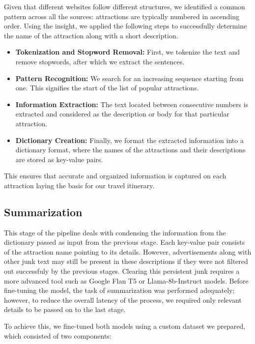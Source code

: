 \documentclass[sigconf,authordraft]{acmart}
\begin{document}
    Given that different websites follow different structures, we identified a common pattern across all the sources: attractions are typically numbered in ascending order. Using the insight, we applied the following steps to successfully determine the name of the attraction along with a short description.

    \begin{itemize}
        \item \textbf{Tokenization and Stopword Removal:} First, we tokenize the text and remove stopwords, after which we extract the sentences.

        \item \textbf{Pattern Recognition:} We search for an increasing sequence starting from one. This signifies the start of the list of popular attractions.

        \item \textbf{Information Extraction:} The text located between consecutive numbers is extracted and considered as the description or body for that particular attraction.

        \item \textbf{Dictionary Creation:} Finally, we format the extracted information into a dictionary format, where the names of the attractions and their descriptions are stored as key-value pairs.
    \end{itemize}

    This ensures that accurate and organized information is captured on each attraction laying the basis for our travel itinerary.

  \subsection{Summarization}
    This stage of the pipeline deals with condensing the information from the dictionary passed as input from the previous stage. Each key-value pair consists of the attraction name pointing to its details. However, advertisements along with other junk text may still be present in these descriptions if they were not filtered out successfuly by the previous stages. Clearing this persistent junk requires a more advanced tool such as Google Flan T5 or Llama-8b-Instruct models. Before fine-tuning the model, the task of summarization was performed adequately; however, to reduce the overall latency of the process, we required only relevant details to be passed on to the last stage.

    To achieve this, we fine-tuned both models using a custom dataset we prepared, which consisted of two components:
\end{document}

